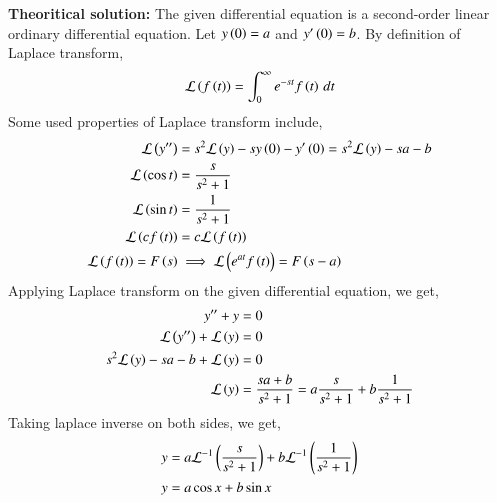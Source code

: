 \documentclass[journal]{IEEEtran}
\begin{document}
\textbf{Theoritical solution:} \newline
The given differential equation is a second-order linear ordinary differential equation. \newline
Let $y\left(0\right) = a$ and $y^{\prime}\left(0\right) = b$.
By definition of Laplace transform,
\begin{align}
    \mathcal{L}\left(f\left(t\right)\right) = \int_0^{\infty} e^{-st} f\left(t\right) \, dt
\end{align}
Some used properties of Laplace transform include,
\begin{align}
    \mathcal{L}\left(y^{\prime\prime}\right) &= s^2\mathcal{L}\left(y\right) -sy\left(0\right)-y^\prime\left(0\right) = s^2\mathcal{L}\left(y\right) -sa - b\\
    \mathcal{L}\left(\cos{t}\right) &= \frac{s}{s^2 + 1}\\
    \mathcal{L}\left(\sin{t}\right) &= \frac{1}{s^2 + 1}\\
    \mathcal{L}\left(cf\left(t\right)\right) &= c\mathcal{L}\left(f\left(t\right)\right)\\
    \mathcal{L}\left(f\left(t\right)\right) = F\left(s\right) &\implies \mathcal{L}\left(e^{at}f\left(t\right)\right) = F\left(s-a\right)
\end{align}
Applying Laplace transform on the given differential equation, we get,
\begin{align}
    y^{\prime\prime} + y &= 0\\
    \mathcal{L}\left(y^{\prime\prime}\right) + \mathcal{L}\left(y\right) &= 0\\
    s^2\mathcal{L}\left(y\right) - sa - b + \mathcal{L}\left(y\right) &= 0\\
    \mathcal{L}\left(y\right) &= \frac{sa + b}{s^2 + 1} = a\frac{s}{s^2 + 1} + b\frac{1}{s^2 + 1} \label{laplace_eq}\\
\end{align}
Taking laplace inverse on both sides, we get,
\begin{align}
    y &= a\mathcal{L}^{-1}\left(\frac{s}{s^2 + 1}\right) + b\mathcal{L}^{-1}\left(\frac{1}{s^2 + 1}\right)\\
    y &= a\cos{x} + b\sin{x}\\
\end{align}
\end{document}
